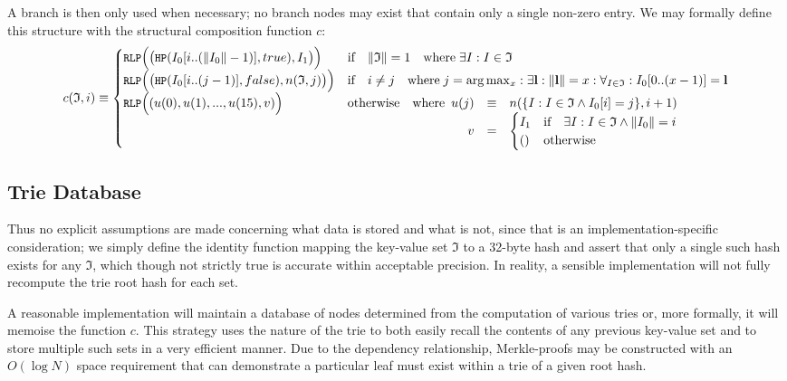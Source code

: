 \documentclass[9pt,oneside]{amsart}
\begin{document}
A branch is then only used when necessary; no branch nodes may exist that contain only a single non-zero entry. We may formally define this structure with the structural composition function $c$:
\begin{equation}
c(\mathfrak{I}, i) \equiv \begin{cases}
\texttt{\small RLP}\Big( \big(\texttt{\small HP}(I_0[i .. (\lVert I_0\rVert - 1)], true), I_1 \big) \Big) & \text{if} \quad \lVert \mathfrak{I} \rVert = 1 \quad \text{where} \; \exists I: I \in \mathfrak{I} \\
\texttt{\small RLP}\Big( \big(\texttt{\small HP}(I_0[i .. (j - 1)], false), n(\mathfrak{I}, j) \big) \Big) & \text{if} \quad i \ne j \quad \text{where} \; j = \arg \max_x : \exists \mathbf{l}: \lVert \mathbf{l} \rVert = x : \forall_{I \in \mathfrak{I}}: I_0[0 .. (x - 1)] = \mathbf{l} \\
\texttt{\small RLP}\Big( (u(0), u(1), ..., u(15), v) \Big) & \text{otherwise} \quad \text{where} \begin{array}[t]{rcl}
u(j) & \equiv & n(\{ I : I \in \mathfrak{I} \wedge I_0[i] = j \}, i + 1) \\
v & = & \begin{cases}
I_1 & \text{if} \quad \exists I: I \in \mathfrak{I} \wedge \lVert I_0 \rVert = i \\
() & \text{otherwise}
\end{cases}
\end{array}
\end{cases}
\end{equation}

\subsection{Trie Database}
Thus no explicit assumptions are made concerning what data is stored and what is not, since that is an implementation-specific consideration; we simply define the identity function mapping the key-value set $\mathfrak{I}$ to a 32-byte hash and assert that only a single such hash exists for any $\mathfrak{I}$, which though not strictly true is accurate within acceptable precision. In reality, a sensible implementation will not fully recompute the trie root hash for each set.

A reasonable implementation will maintain a database of nodes determined from the computation of various tries or, more formally, it will memoise the function $c$. This strategy uses the nature of the trie to both easily recall the contents of any previous key-value set and to store multiple such sets in a very efficient manner. Due to the dependency relationship, Merkle-proofs may be constructed with an $O(\log N)$ space requirement that can demonstrate a particular leaf must exist within a trie of a given root hash.
\end{document}
